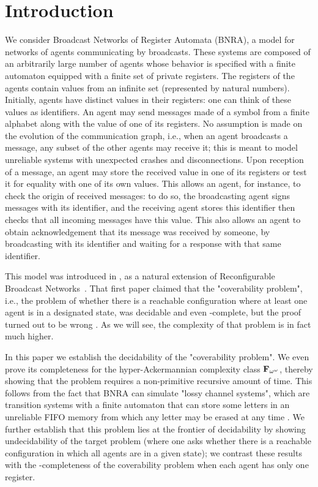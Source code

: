 \section{Introduction}
We consider Broadcast Networks of Register Automata (BNRA), a model for networks of agents communicating by broadcasts. These systems are composed of an arbitrarily large number of agents whose behavior is specified with a finite automaton equipped with a finite set of private registers. The registers of the agents contain values from an infinite set (represented by natural numbers). Initially, agents have distinct values in their registers: one can think of these values as identifiers. An agent may send messages made of a symbol from a finite alphabet along with the value of one of its registers. No assumption is made on the evolution of the communication graph, i.e., when an agent broadcasts a message, any subset of the other agents may receive it; this is meant to model unreliable systems with unexpected crashes and disconnections. Upon reception of a message, an agent may store the received value in one of its registers or test it for equality with one of its own values. 
This allows an agent, for instance, to check the origin of received messages: to do so, the broadcasting agent signs messages with its identifier, and the receiving agent stores this identifier then checks that all incoming messages have this value. This also allows an agent to obtain acknowledgement that its message was received by someone, by broadcasting with its identifier and waiting for a response with that same identifier.

This model was introduced in \cite{DelzannoST13}, as a natural extension of Reconfigurable Broadcast Networks~\cite{DelzannoSZ2010Adhoc}. That first paper claimed that the "coverability problem", i.e., the problem of whether there is a reachable configuration where at least one agent is in a designated state, was decidable and even \PSPACE-complete, but the proof turned out to be wrong \cite{ArnaudErratum}. As we will see, the complexity of that problem is in fact much higher.

In this paper we establish the decidability of the "coverability problem". We even prove its completeness for the hyper-Ackermannian complexity class $\mathbf{F}_{\omega^\omega}$, thereby showing that the problem requires a non-primitive recursive amount of time. This follows from the fact that BNRA can simulate "lossy channel systems", which are transition systems with a finite automaton that can store some letters in an unreliable FIFO memory from which any letter may be erased at any time \cite{AbdullaJ1996verif, Schnoebelen2002verifying,ChambartS08ordinal}. 
We further establish that this problem lies at the frontier of decidability by showing undecidability of the target problem (where one asks whether there is a reachable configuration in which all agents are in a given state); we contrast these results with the \NP-completeness of the coverability problem when each agent has only one register. 

